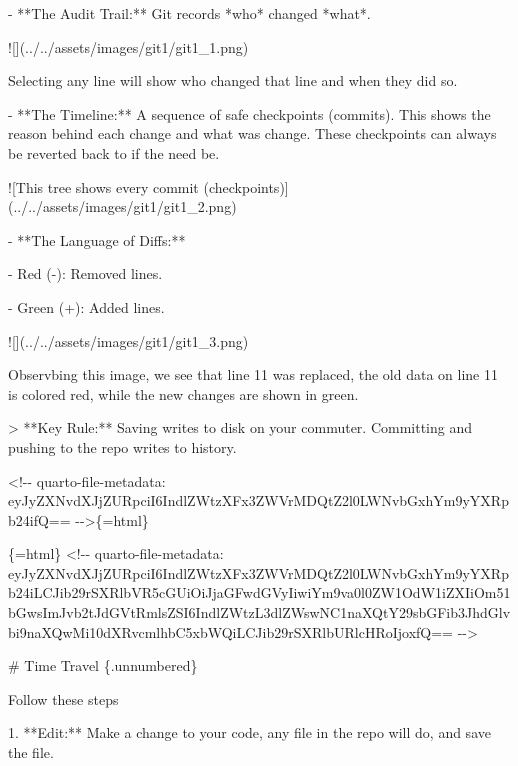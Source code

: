 \documentclass[
  letterpaper,
  DIV=11,
  numbers=noendperiod,
  oneside]{scrreprt}
\newenvironment{Shaded}{\begin{snugshade}}{\end{snugshade}}
\newcommand{\AlertTok}[1]{\textcolor[rgb]{0.68,0.00,0.00}{#1}}
\newcommand{\AttributeTok}[1]{\textcolor[rgb]{0.40,0.45,0.13}{#1}}
\newcommand{\FunctionTok}[1]{\textcolor[rgb]{0.28,0.35,0.67}{#1}}
\newcommand{\InformationTok}[1]{\textcolor[rgb]{0.37,0.37,0.37}{#1}}
\newcommand{\NormalTok}[1]{\textcolor[rgb]{0.00,0.23,0.31}{#1}}
\newcommand{\SpecialStringTok}[1]{\textcolor[rgb]{0.13,0.47,0.30}{#1}}
\begin{document}
\begin{Shaded}
\begin{Highlighting}[numbers=left,,]
\SpecialStringTok{{-}   }\NormalTok{**The Audit Trail:** Git records *who* changed *what*.}

    \AlertTok{![](../../assets/images/git1/git1\_1.png)}

\NormalTok{    Selecting any line will show who changed that line and when they did so.}

\SpecialStringTok{{-}   }\NormalTok{**The Timeline:** A sequence of safe checkpoints (commits). This shows the reason behind each change and what was change. These checkpoints can always be reverted back to if the need be.}

    \AlertTok{![This tree shows every commit (checkpoints)](../../assets/images/git1/git1\_2.png)}

\SpecialStringTok{{-}   }\NormalTok{**The Language of Diffs:**}

\SpecialStringTok{    {-}   }\InformationTok{\textasciigrave{}Red ({-})\textasciigrave{}}\NormalTok{: Removed lines.}

\SpecialStringTok{    {-}   }\InformationTok{\textasciigrave{}Green (+)\textasciigrave{}}\NormalTok{: Added lines.}

        \AlertTok{![](../../assets/images/git1/git1\_3.png)}

\NormalTok{        Observbing this image, we see that line 11 was replaced, the old data on line 11 is colored red, while the new changes are shown in green.}

\AttributeTok{\textgreater{} **Key Rule:** Saving writes to disk on your commuter. Committing and pushing to the repo writes to history.}


\InformationTok{\textasciigrave{}\textless{}!{-}{-} quarto{-}file{-}metadata: eyJyZXNvdXJjZURpciI6IndlZWtzXFx3ZWVrMDQtZ2l0LWNvbGxhYm9yYXRpb24ifQ== {-}{-}\textgreater{}\textasciigrave{}}\NormalTok{\{=html\}}

\InformationTok{\textasciigrave{}\textasciigrave{}\textasciigrave{}\{=html\}}
\InformationTok{\textless{}!{-}{-} quarto{-}file{-}metadata: eyJyZXNvdXJjZURpciI6IndlZWtzXFx3ZWVrMDQtZ2l0LWNvbGxhYm9yYXRpb24iLCJib29rSXRlbVR5cGUiOiJjaGFwdGVyIiwiYm9va0l0ZW1OdW1iZXIiOm51bGwsImJvb2tJdGVtRmlsZSI6IndlZWtzL3dlZWswNC1naXQtY29sbGFib3JhdGlvbi9naXQwMi10dXRvcmlhbC5xbWQiLCJib29rSXRlbURlcHRoIjoxfQ== {-}{-}\textgreater{}}
\InformationTok{\textasciigrave{}\textasciigrave{}\textasciigrave{}}

\FunctionTok{\# Time Travel \{.unnumbered\}}


\NormalTok{Follow these steps}

\SpecialStringTok{1.  }\NormalTok{**Edit:** Make a change to your code, any file in the repo will do, and save the file.}


\end{Highlighting}
\end{Shaded}
\end{document}
